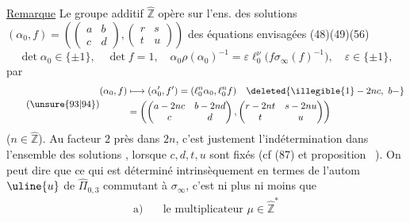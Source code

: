 

\uline{Remarque} Le groupe additif $\widehat{\mathbb Z}$ opère sur l'ens.
des solutions
$(\alpha_0,f)=\left(\begin{pmatrix}a&b\\c&d\end{pmatrix},
\begin{pmatrix}r&s\\t&u\end{pmatrix}\right)$
des équations envisagées (48)(49)(56)
\[
\tag{93}
\det\alpha_0\in\{\pm1\},\quad\det f=1,\quad
\alpha_0\rho(\alpha_0)^{-1}
=\varepsilon\ell_0^{\nu}\bigl(f\sigma_\infty(f)^{-1}\bigr),
\quad\varepsilon\in\{\pm1\},
\]
par
\[
\tag{\unsure{93|94}}
\begin{aligned}
(\alpha_0,f)&\longmapsto(\alpha'_0,f')
=(\ell_0^n\alpha_0,\ell_0^nf)\quad\deleted{\illegible{1}-2nc,\ b-}\\
&=\left(\begin{pmatrix}a-2nc&b-2nd\\c&d\end{pmatrix},
\begin{pmatrix}r-2nt&s-2nu\\t&u\end{pmatrix}\right)
\end{aligned}
\]
($n\in\widehat{\mathbb Z}$).
Au facteur $2$ près dans $2n$, c'est justement l'indétermination dans
 l'ensemble des solutions , lorsque
$c,d,t,u$ sont fixés (cf (87) et proposition \ ).
On peut  dire que ce qui est déterminé
intrinsèquement 
en termes de l'autom  $\uline{u}$ de
$\widehat{\Pi}_{0,3}$ commutant à $\sigma_\infty$, c'est ni plus ni moins
que 
\[
\tag{95}
\begin{aligned}
\text{a)}\quad&\text{le multiplicateur }\mu\in\widehat{\mathbb Z}^{*}
\end{aligned}
\]

